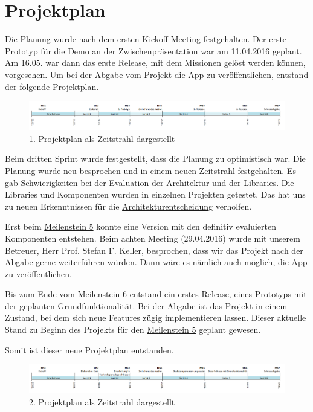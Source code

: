 

\section{Projektplan}
\label{pm-projektplan}

Die Planung wurde nach dem ersten \hyperref[pm-ms1]{Kickoff-Meeting} festgehalten. 
Der erste Prototyp für die Demo an der Zwischenpräsentation war am 11.04.2016 geplant. 
Am 16.05. war dann das erste Release, mit dem Missionen gelöst werden können, vorgesehen. 
Um bei der Abgabe vom Projekt die App zu veröffentlichen, entstand der folgende Projektplan.

\begin{figure}[H]
	\centering
	\includegraphics[width=\textwidth]{images/projektmanagement/zeitstrahl_v1.png}
	\caption{1. Projektplan als Zeitstrahl dargestellt}
	\label{image-project-plan-timeline1}
\end{figure}

Beim dritten Sprint wurde festgestellt, dass die Planung zu optimistisch war. 
Die Planung wurde neu besprochen und in einem neuen \hyperref[image-project-plan-timeline2]{Zeitstrahl} festgehalten. 
Es gab Schwierigkeiten bei der Evaluation der Architektur und der Libraries. 
Die Libraries und Komponenten wurden in einzelnen Projekten getestet. 
Das hat uns zu neuen Erkenntnissen für die \hyperref[tb-evaluation-architektur]{Architekturentscheidung} verholfen. 

Erst beim \hyperref[pm-ms5]{Meilenstein 5} konnte eine Version mit den definitiv evaluierten Komponenten entstehen. 
Beim achten Meeting (29.04.2016) wurde mit unserem Betreuer, Herr Prof. Stefan F. Keller, besprochen, dass wir das Projekt nach der Abgabe gerne weiterführen würden.
Dann wäre es nämlich auch möglich, die App zu veröffentlichen.

Bis zum Ende vom \hyperref[pm-ms6]{Meilenstein 6} entstand ein erstes Release, eines Prototyps mit der geplanten Grundfunktionalität. 
Bei der Abgabe ist das Projekt in einem Zustand, bei dem sich neue Features zügig implementieren lassen.
Dieser aktuelle Stand zu Beginn des Projekts für den \hyperref[pm-ms5]{Meilenstein 5} geplant gewesen.

Somit ist dieser neue Projektplan entstanden.

\begin{figure}[H]
	\centering
	\includegraphics[width=\textwidth]{images/projektmanagement/zeitstrahl_v2.png}
	\caption{2. Projektplan als Zeitstrahl dargestellt}
	\label{image-project-plan-timeline2}
\end{figure}




